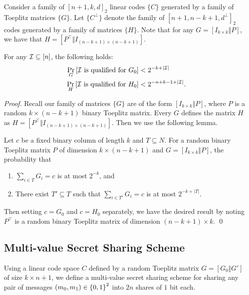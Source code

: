 Consider a family of $[n+1,k,d]_2$ linear codes $\{C\}$ generated by a family of Toeplitz matrices $\{G\}$.
Let $\{C^\perp\}$ denote the family of $[n+1, n-k+1,d^\perp]_2$ codes generated by a family of matrices $\{H\}$.
Note that for any $G = [I_{k\times k} \Vert P]$, we have that $H = [P^\top\Vert I_{(n-k+1)\times (n-k+1)}]$.

\begin{lemma}
	For any ${\mathcal I} \subseteq [n]$, the following holds:
	\begin{align*}
		\Pr_G\left[{\mathcal I} \text{ is qualified for } G_0\right] &< 2^{-k+|{\mathcal I}|}\\
		\Pr_H\left[{\mathcal I} \text{ is qualified for } H_0\right] &< 2^{-n+k-1+|{\mathcal I}|}.
	\end{align*}
\end{lemma}
\begin{proof}
	Recall our family of matrices $\{G\}$ are of the form $[I_{k\times k}\Vert P]$, where $P$ is a random $k\times (n-k+1)$ binary Toeplitz matrix.
	Every $G$ defines the matrix $H$ as $H = [P^\top\Vert I_{(n-k+1)\times (n-k+1)}]$.
	Then we use the following lemma.
	\begin{importedlemma}
		Let $c$ be a fixed binary column of length $k$ and $T \subseteq N$.
		For a random binary Toeplitz matrix $P$ of dimension $k \times (n-k+1)$ and $G = [I_{k \times k}\Vert P]$, the probability that
		\begin{enumerate}
			\item $\sum_{i \in T} G_i = c$ is at most $2^{-k}$, and
			\item There exist $T' \subseteq T$ such that $\sum_{i \in T'} G_i = c$ is at most $2^{-k+|T|}$.
		\end{enumerate}
	\end{importedlemma}
	Then setting $c = G_0$ and $c= H_0$ separately, we have the desired result by noting $P^\top$ is a random binary Toeplitz matrix of dimension $(n-k+1) \times k$. \qed
\end{proof}

\subsection{Multi-value Secret Sharing Scheme}
Using a linear code space $C$ defined by a random Toeplitz matrix $G = [G_0\Vert G']$ of size $k \times n+1$, we define a multi-value secret sharing scheme for sharing any pair of messages $(m_0,m_1) \in {\{0,1\}}^2$ into $2n$ shares of $1$ bit each.

